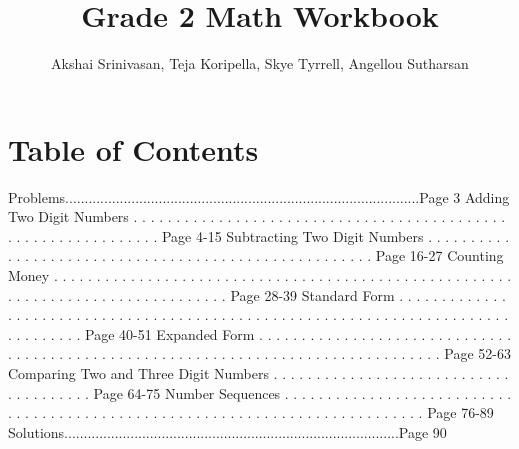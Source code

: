 \documentclass{article}%
\title{Grade 2 Math Workbook}%
\author{Akshai Srinivasan, Teja Koripella, Skye Tyrrell, Angellou Sutharsan}%
\date{}%
\begin{document}
%
\normalsize%
\maketitle%
\newpage%
\section{Table of Contents}%
\label{sec:TableofContents}%
Problems...........................................................................................Page 3%
\newline%
Adding Two Digit Numbers%
.%
.%
.%
.%
.%
.%
.%
.%
.%
.%
.%
.%
.%
.%
.%
.%
.%
.%
.%
.%
.%
.%
.%
.%
.%
.%
.%
.%
.%
.%
.%
.%
.%
.%
.%
.%
.%
.%
.%
.%
.%
.%
.%
.%
.%
.%
.%
.%
.%
.%
.%
.%
.%
.%
.%
.%
.%
.%
.%
.%
.%
.%
Page 4{-}15%
\newline%
Subtracting Two Digit Numbers%
.%
.%
.%
.%
.%
.%
.%
.%
.%
.%
.%
.%
.%
.%
.%
.%
.%
.%
.%
.%
.%
.%
.%
.%
.%
.%
.%
.%
.%
.%
.%
.%
.%
.%
.%
.%
.%
.%
.%
.%
.%
.%
.%
.%
.%
.%
.%
.%
.%
.%
.%
.%
.%
Page 16{-}27%
\newline%
Counting Money%
.%
.%
.%
.%
.%
.%
.%
.%
.%
.%
.%
.%
.%
.%
.%
.%
.%
.%
.%
.%
.%
.%
.%
.%
.%
.%
.%
.%
.%
.%
.%
.%
.%
.%
.%
.%
.%
.%
.%
.%
.%
.%
.%
.%
.%
.%
.%
.%
.%
.%
.%
.%
.%
.%
.%
.%
.%
.%
.%
.%
.%
.%
.%
.%
.%
.%
.%
.%
.%
.%
.%
.%
.%
.%
.%
.%
.%
.%
.%
.%
Page 28{-}39%
\newline%
Standard Form%
.%
.%
.%
.%
.%
.%
.%
.%
.%
.%
.%
.%
.%
.%
.%
.%
.%
.%
.%
.%
.%
.%
.%
.%
.%
.%
.%
.%
.%
.%
.%
.%
.%
.%
.%
.%
.%
.%
.%
.%
.%
.%
.%
.%
.%
.%
.%
.%
.%
.%
.%
.%
.%
.%
.%
.%
.%
.%
.%
.%
.%
.%
.%
.%
.%
.%
.%
.%
.%
.%
.%
.%
.%
.%
.%
.%
.%
.%
.%
.%
.%
Page 40{-}51%
\newline%
Expanded Form%
.%
.%
.%
.%
.%
.%
.%
.%
.%
.%
.%
.%
.%
.%
.%
.%
.%
.%
.%
.%
.%
.%
.%
.%
.%
.%
.%
.%
.%
.%
.%
.%
.%
.%
.%
.%
.%
.%
.%
.%
.%
.%
.%
.%
.%
.%
.%
.%
.%
.%
.%
.%
.%
.%
.%
.%
.%
.%
.%
.%
.%
.%
.%
.%
.%
.%
.%
.%
.%
.%
.%
.%
.%
.%
.%
.%
.%
.%
.%
.%
.%
Page 52{-}63%
\newline%
Comparing Two and Three Digit Numbers%
.%
.%
.%
.%
.%
.%
.%
.%
.%
.%
.%
.%
.%
.%
.%
.%
.%
.%
.%
.%
.%
.%
.%
.%
.%
.%
.%
.%
.%
.%
.%
.%
.%
.%
.%
.%
.%
.%
Page 64{-}75%
\newline%
Number Sequences%
.%
.%
.%
.%
.%
.%
.%
.%
.%
.%
.%
.%
.%
.%
.%
.%
.%
.%
.%
.%
.%
.%
.%
.%
.%
.%
.%
.%
.%
.%
.%
.%
.%
.%
.%
.%
.%
.%
.%
.%
.%
.%
.%
.%
.%
.%
.%
.%
.%
.%
.%
.%
.%
.%
.%
.%
.%
.%
.%
.%
.%
.%
.%
.%
.%
.%
.%
.%
.%
.%
.%
.%
.%
.%
.%
.%
Page 76{-}89%
\newline%
Solutions......................................................................................Page 90%
\end{document}
